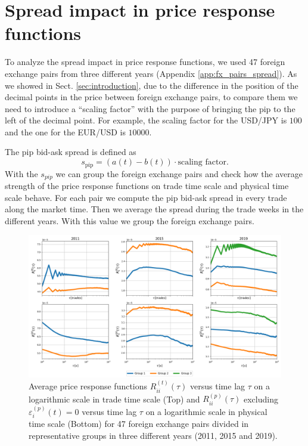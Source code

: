 \section{Spread impact in price response functions}\label{sec:spread_impact}

To analyze the spread impact in price response functions, we used 47 foreign
exchange pairs from three different years (Appendix \ref{app:fx_pairs_spread}).
As we showed in Sect. \ref{sec:introduction}, due to the difference in the
position of the decimal points in the price between foreign exchange pairs, to
compare them we need to introduce a ``scaling factor'' with the purpose of
bringing the pip to the left of the decimal point. For example, the scaling
factor for the USD/JPY is $100$ and the one for the EUR/USD is $10000$.

The pip bid-ask spread is defined as \cite{micro_eff}
\begin{equation}
    s_{\textrm{pip}} = \left(a\left(t\right) - b\left(t\right)\right) \cdot
    \textrm{scaling factor}.
\end{equation}
With the $s_{pip}$ we can group the foreign exchange pairs and check how the
average strength of the price response functions on trade time scale and
physical time scale behave. For each pair we compute the pip bid-ask spread in
every trade along the market time. Then we average the spread during the trade
weeks in the different years. With this value we group the foreign exchange
pairs.

\begin{figure}[htbp]
    \centering
    \includegraphics[width=\textwidth]{figures/05_spread_impact.png}
    \caption{Average price response functions
             $R^{\left(t\right)}_{ii}\left(\tau\right)$ versus time lag $\tau$
             on a logarithmic scale in trade time scale (Top) and
             $R^{\left(p\right)}_{ii}\left(\tau\right)$ excluding
             $\varepsilon^{\left(p\right)}_{i}\left(t\right) = 0$ versus time
             lag $\tau$ on a logarithmic scale in physical time scale (Bottom)
             for 47 foreign exchange pairs divided in representative groups in
             three different years (2011, 2015 and 2019).}
    \label{fig:spread_impact}
\end{figure}

